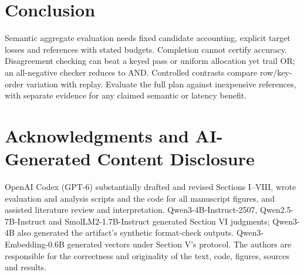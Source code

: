 \documentclass[conference]{IEEEtran}
\begin{document}
\section{Conclusion}
Semantic aggregate evaluation needs fixed candidate accounting, explicit target losses and references with stated budgets. Completion cannot certify accuracy. Disagreement checking can beat a keyed pass or uniform allocation yet trail OR; an all-negative checker reduces to AND. Controlled contrasts compare row/key-order variation with replay. Evaluate the full plan against inexpensive references, with separate evidence for any claimed semantic or latency benefit.

\section*{Acknowledgments and AI-Generated Content Disclosure}
OpenAI Codex (GPT-6) substantially drafted and revised Sections I--VIII, wrote evaluation and analysis scripts and the code for all manuscript figures, and assisted literature review and interpretation. Qwen3-4B-Instruct-2507, Qwen2.5-7B-Instruct and SmolLM2-1.7B-Instruct generated Section VI judgments; Qwen3-4B also generated the artifact's synthetic format-check outputs. Qwen3-Embedding-0.6B generated vectors under Section V's protocol. The authors are responsible for the correctness and originality of the text, code, figures, sources and results.
\end{document}
